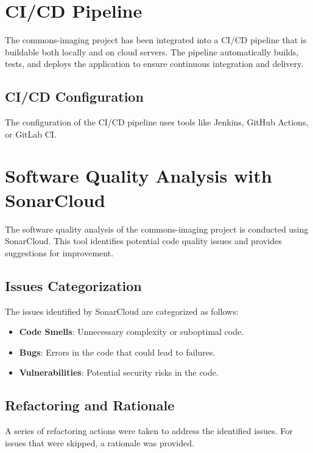 \documentclass[a4paper,12pt]{report}
\begin{document}
\newpage

\chapter{CI/CD Pipeline}
The commons-imaging project has been integrated into a CI/CD pipeline that is buildable both locally and on cloud servers. The pipeline automatically builds, tests, and deploys the application to ensure continuous integration and delivery.

\section{CI/CD Configuration}
The configuration of the CI/CD pipeline uses tools like Jenkins, GitHub Actions, or GitLab CI.

\newpage

\chapter{Software Quality Analysis with SonarCloud}
The software quality analysis of the commons-imaging project is conducted using SonarCloud. This tool identifies potential code quality issues and provides suggestions for improvement.

\section{Issues Categorization}
The issues identified by SonarCloud are categorized as follows:
\begin{itemize}
    \item \textbf{Code Smells}: Unnecessary complexity or suboptimal code.
    \item \textbf{Bugs}: Errors in the code that could lead to failures.
    \item \textbf{Vulnerabilities}: Potential security risks in the code.
\end{itemize}

\section{Refactoring and Rationale}
A series of refactoring actions were taken to address the identified issues. For issues that were skipped, a rationale was provided. 
\end{document}
